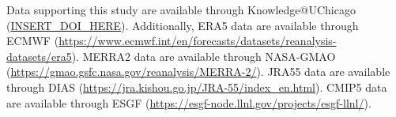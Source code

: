 \documentclass{ametsocV5}
\begin{document}
% 
%
\datastatement
Data supporting this study are available through Knowledge@UChicago (\url{INSERT_DOI_HERE}). Additionally, ERA5 data are available through ECMWF (\url{https://www.ecmwf.int/en/forecasts/datasets/reanalysis-datasets/era5}). MERRA2 data are available through NASA-GMAO (\url{https://gmao.gsfc.nasa.gov/reanalysis/MERRA-2/}). JRA55 data are available through DIAS (\url{https://jra.kishou.go.jp/JRA-55/index_en.html}). CMIP5 data are available through ESGF (\url{https://esgf-node.llnl.gov/projects/esgf-llnl/}). 

%






%
%
\end{document}

